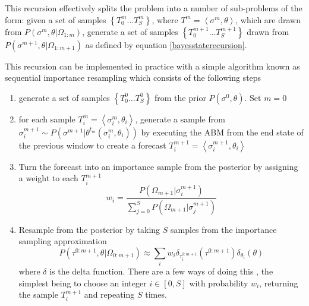 \documentclass{article}
\begin{document}
This recursion effectively splits the problem into a number of sub-problems of the form: given a set of samples $\left\{T^m_0 \dots T^m_S\right\}$, where $T^m=\left<\sigma^m,\theta\right>$, which are drawn from $P(\sigma^m,\theta|\Omega_{1:m})$, generate a set of samples  $\left\{T^{m+1}_0 \dots T^{m+1}_S\right\}$ drawn from $P(\sigma^{m+1},\theta|\Omega_{1:m+1})$ as defined by equation \eqref{bayesstaterecursion}.  

This recursion can be implemented in practice with a simple algorithm known as sequential importance resampling which consists of the following steps
\begin{enumerate}
\item generate a set of samples $\left\{T^0_0 \dots T^0_S\right\}$ from the prior $P(\sigma^0,\theta)$. Set $m=0$

\item for each sample $T^m_i = \left<\sigma^m_i,\theta_i\right>$, generate a sample from $\sigma^{m+1}_i \sim P(\sigma^{m+1}|\theta^{t_m}(\sigma^m_i,\theta_i))$ by executing the ABM from the end state of the previous window to create a forecast $T^{m+1}_i = \left<\sigma^{m+1}_i,\theta_i\right>$

\item Turn the forecast into an importance sample from the posterior by assigning a weight to each $T^{m+1}_i$
\[
w_i = \frac{P(\Omega_{m+1}|\sigma^{m+1}_i)}{\sum_{j=0}^S P(\Omega_{m+1}|\sigma^{m+1}_j)}
\]

\item Resample from the posterior by taking $S$ samples from the importance sampling approximation
\begin{equation}
P(\tau^{0:m+1},\theta|\Omega_{0:m+1}) \approx  \sum_i w_i\delta_{\tau^{0:m+1}_i}\left(\tau^{0:m+1}\right)\delta_{\theta_i}(\theta)
\label{importanceApprox}
\end{equation}
where $\delta$ is the delta function. There are a few ways of doing this \citep{douc2005comparison}, the simplest being to choose an integer $i\in[0,S]$ with probability $w_i$, returning the sample $T^{m+1}_i$ and repeating $S$ times.

\end{enumerate}
\end{document}
